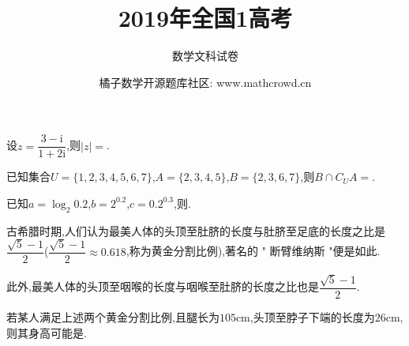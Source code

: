 \documentclass[windows,list]{BHCexam}
\begin{document}
\title{2019年全国1高考}
\subtitle{数学文科试卷}
\author{橘子数学开源题库社区: www.mathcrowd.cn}
\date{}
\maketitle
\begin{groups}
\begin{questions}[]
\begin{minipage}{\linewidth}
\question[5] 设$z= \dfrac {3-\mathrm{i}}{1+2\mathrm{i}}$,则$|z|=$.
\begin{solution}{4cm}

\end{solution}
\end{minipage}

\vfill

\begin{minipage}{\linewidth}
\question[5] 已知集合$U=\{1 , 2 , 3 , 4 , 5 , 6 , 7\}$,$A=\{2 , 3 , 4 , 5\}$,$B=\{2 , 3 , 6 , 7\}$,则$B \cap  {C}_{U}A =$.

\begin{solution}{4cm}

\end{solution}
\end{minipage}
\vfill
\begin{minipage}{\linewidth}
\question[5] 已知$a=\log _{2} 0.2$,$b=2 ^{0.2}$,$c=0.2 ^{0.3}$,则.
\begin{solution}{4cm}

\end{solution}
\end{minipage}
\vfill
\begin{minipage}{\linewidth}
	
\question[5] 古希腊时期,人们认为最美人体的头顶至肚脐的长度与肚脐至足底的长度之比是$\dfrac{ \sqrt{5} - 1}{2}$($\dfrac{ \sqrt{5} - 1}{2}  \approx 0.618$,称为黄金分割比例),著名的 " 断臂维纳斯 "便是如此.

此外,最美人体的头顶至咽喉的长度与咽喉至肚脐的长度之比也是$\dfrac{ \sqrt{5} - 1}{2}$.

若某人满足上述两个黄金分割比例,且腿长为$105\text{cm}$,头顶至脖子下端的长度为$26 \text{cm}$,则其身高可能是.


\end{minipage}
\end{questions}
\end{groups}
\end{document}
